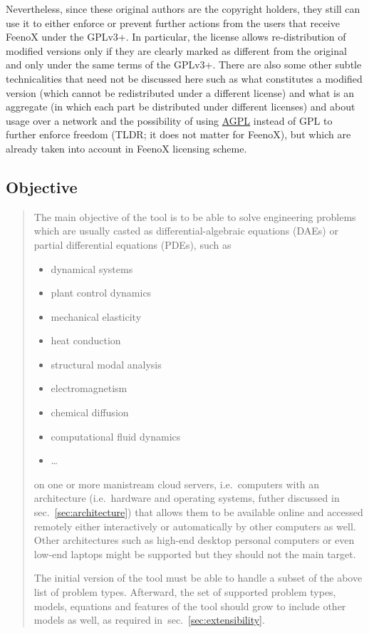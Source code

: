 \documentclass[
  american,
]{article}
\providecommand{\tightlist}{%
  \setlength{\itemsep}{0pt}\setlength{\parskip}{0pt}}
\begin{document}
Nevertheless, since these original authors are the copyright holders,
they still can use it to either enforce or prevent further actions from
the users that receive FeenoX under the GPLv3+. In particular, the
license allows re-distribution of modified versions only if they are
clearly marked as different from the original and only under the same
terms of the GPLv3+. There are also some other subtle technicalities
that need not be discussed here such as what constitutes a modified
version (which cannot be redistributed under a different license) and
what is an aggregate (in which each part be distributed under different
licenses) and about usage over a network and the possibility of using
\href{https://en.wikipedia.org/wiki/GNU_Affero_General_Public_License}{AGPL}
instead of GPL to further enforce freedom (TLDR; it does not matter for
FeenoX), but which are already taken into account in FeenoX licensing
scheme.

\hypertarget{sec:objective}{%
\subsection{Objective}\label{sec:objective}}

\begin{quote}
The main objective of the tool is to be able to solve engineering
problems which are usually casted as differential-algebraic equations
(DAEs) or partial differential equations (PDEs), such as

\begin{itemize}
\tightlist
\item
  dynamical systems
\item
  plant control dynamics
\item
  mechanical elasticity
\item
  heat conduction
\item
  structural modal analysis
\item
  electromagnetism
\item
  chemical diffusion
\item
  computational fluid dynamics
\item
  \ldots{}
\end{itemize}

on one or more manistream cloud servers, i.e.~computers with an
architecture (i.e.~hardware and operating systems, futher discussed in
sec.~\ref{sec:architecture}) that allows them to be available online and
accessed remotely either interactively or automatically by other
computers as well. Other architectures such as high-end desktop personal
computers or even low-end laptops might be supported but they should not
the main target.

The initial version of the tool must be able to handle a subset of the
above list of problem types. Afterward, the set of supported problem
types, models, equations and features of the tool should grow to include
other models as well, as required in~sec.~\ref{sec:extensibility}.
\end{quote}
\end{document}
